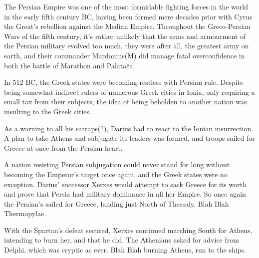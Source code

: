 \documentclass[a4paper, 12pt]{article}
\begin{document}
\par\vspace{1em}

The Persian Empire was one of the most formidable fighting forces in the world
in the early fifth century BC, having been formed mere decades prior with
Cyrus the Great's rebellion against the Median Empire. Throughout the
Greco-Persian Wars of the fifth century, it's rather unlikely that the arms
and armourment of the Persian military evolved too much, they were after all,
the greatest army on earth, and their commander Mardonius(M) did manage
fatal overconfidence in both the battle of Marathon and Palata\^ea.

\par\vspace{1em}

In 512 BC, the Greek states were becoming restless with Persian rule. Despite
being somewhat indirect rulers of numerous Greek cities in Ionia, only requiring
a small tax from their subjects, the idea of being beholden to another nation
was insulting to the Greek cities.

\par\vspace{1em}

As a warning to all his satraps(?), Darius had to react to the Ionian
insurrection. A plan to take Athens and subjugate its leaders was formed,
and troops sailed for Greece at once from the Persian heart.

\par\vspace{1em}

A nation resisting Persian subjugation could never stand for long without
becoming the Emperor's target once again, and the Greek states were no
exception. Darius' successor Xerxes would attempt to sack Greece for its worth
and prove that Persia had military dominance in all her Empire. So once again
the Persian's sailed for Greece, landing just North of Thessaly.
Blah Blah Thermopylae.

\par\vspace{1em}

With the Spartan's defeat secured, Xerxes continued marching South for
Athens, intending to burn her, and that he did. The Athenians asked for advice
from Delphi, which was cryptic as ever.
Blah Blah burning Athens, run to the ships.

\par\vspace{1em}
\end{document}
